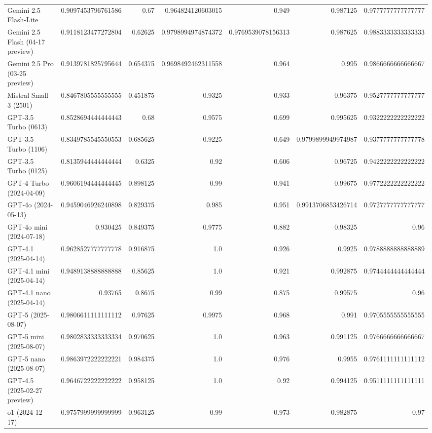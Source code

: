 \begin{table}[htp]
{\begin{tabular}{lrrrrrr}
Gemini 2.5 Flash-Lite & 0.9097453796761586 & 0.67 & 0.964824120603015 & 0.949 & 0.987125 & 0.9777777777777777 \\
Gemini 2.5 Flash (04-17 preview) & 0.9118123477272804 & 0.62625 & 0.9798994974874372 & 0.9769539078156313 & 0.987625 & 0.9883333333333333 \\
Gemini 2.5 Pro (03-25 preview) & 0.9139781825795644 & 0.654375 & 0.9698492462311558 & 0.964 & 0.995 & 0.9866666666666667 \\
Mistral Small 3 (2501) & 0.8467805555555555 & 0.451875 & 0.9325 & 0.933 & 0.96375 & 0.9527777777777777 \\
GPT-3.5 Turbo (0613) & 0.8528694444444443 & 0.68 & 0.9575 & 0.699 & 0.995625 & 0.9322222222222222 \\
GPT-3.5 Turbo (1106) & 0.8349785545550553 & 0.685625 & 0.9225 & 0.649 & 0.9799899949974987 & 0.9377777777777778 \\
GPT-3.5 Turbo (0125) & 0.8135944444444444 & 0.6325 & 0.92 & 0.606 & 0.96725 & 0.9422222222222222 \\
GPT-4 Turbo (2024-04-09) & 0.9606194444444445 & 0.898125 & 0.99 & 0.941 & 0.99675 & 0.9772222222222222 \\
GPT-4o (2024-05-13) & 0.9459046926240898 & 0.829375 & 0.985 & 0.951 & 0.9913706853426714 & 0.9727777777777777 \\
GPT-4o mini (2024-07-18) & 0.930425 & 0.849375 & 0.9775 & 0.882 & 0.98325 & 0.96 \\
GPT-4.1 (2025-04-14) & 0.9628527777777778 & 0.916875 & 1.0 & 0.926 & 0.9925 & 0.9788888888888889 \\
GPT-4.1 mini (2025-04-14) & 0.9489138888888888 & 0.85625 & 1.0 & 0.921 & 0.992875 & 0.9744444444444444 \\
GPT-4.1 nano (2025-04-14) & 0.93765 & 0.8675 & 0.99 & 0.875 & 0.99575 & 0.96 \\
GPT-5 (2025-08-07) & 0.9806611111111112 & 0.97625 & 0.9975 & 0.968 & 0.991 & 0.9705555555555555 \\
GPT-5 mini (2025-08-07) & 0.9802833333333334 & 0.970625 & 1.0 & 0.963 & 0.991125 & 0.9766666666666667 \\
GPT-5 nano (2025-08-07) & 0.9863972222222221 & 0.984375 & 1.0 & 0.976 & 0.9955 & 0.9761111111111112 \\
GPT-4.5 (2025-02-27 preview) & 0.9646722222222222 & 0.958125 & 1.0 & 0.92 & 0.994125 & 0.9511111111111111 \\
o1 (2024-12-17) & 0.9757999999999999 & 0.963125 & 0.99 & 0.973 & 0.982875 & 0.97 \\

\end{tabular}}
\end{table}
